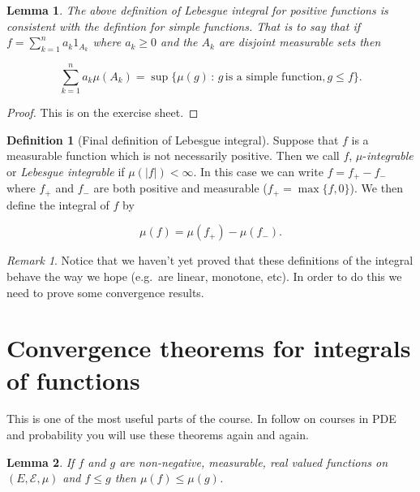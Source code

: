 \documentclass[
]{book}
\newtheorem{lemma}{Lemma}[chapter]
\theoremstyle{definition}
\newtheorem{definition}{Definition}[chapter]
\theoremstyle{definition}
\theoremstyle{definition}
\theoremstyle{definition}
\theoremstyle{remark}
\newtheorem*{remark}{Remark}
\begin{document}
\begin{lemma}
The above definition of Lebesgue integral for positive functions is consistent with the defintion for simple functions. That is to say that if \(f = \sum_{k=1}^n a_k 1_{A_k}\) where \(a_k \geq 0\) and the \(A_k\) are disjoint measurable sets then

\[ \sum_{k=1}^n a_k \mu(A_k) = \sup \{ \mu(g)\, :\, g \, \mbox{is a simple function}, g \leq f\}.  \]
\end{lemma}

\begin{proof}
This is on the exercise sheet.
\end{proof}

\begin{definition}[Final definition of Lebesgue integral]
Suppose that \(f\) is a measurable function which is not necessarily positive. Then we call \(f\), \(\mu\)-\emph{integrable} or \emph{Lebesgue integrable} if \(\mu(|f|)< \infty\). In this case we can write \(f = f_+ - f_{-}\) where \(f_+\) and \(f_-\) are both positive and measurable (\(f_+ = \max\{f, 0\}\)). We then define the integral of \(f\) by

\[ \mu(f) = \mu(f_+) - \mu(f_-). \]
\end{definition}

\begin{remark}
Notice that we haven't yet proved that these definitions of the integral behave the way we hope (e.g.~are linear, monotone, etc). In order to do this we need to prove some convergence results.
\end{remark}

\hypertarget{convergence-theorems-for-integrals-of-functions}{%
\section{Convergence theorems for integrals of functions}\label{convergence-theorems-for-integrals-of-functions}}

This is one of the most useful parts of the course. In follow on courses in PDE and probability you will use these theorems again and again.

\begin{lemma}
If \(f\) and \(g\) are non-negative, measurable, real valued functions on \((E, \mathcal{E}, \mu)\) and \(f \leq g\) then \(\mu(f) \leq \mu(g)\).
\end{lemma}
\end{document}
